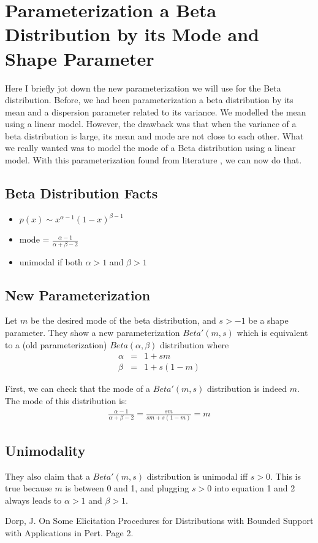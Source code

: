 \documentclass[a4paper,10pt]{article}
\begin{document}
\section{Parameterization a Beta Distribution by its Mode and Shape Parameter}
Here I briefly jot down the new parameterization we will use for the Beta distribution.  Before, we had been parameterization a beta distribution by its mean and a dispersion parameter related to its variance.  We modelled the mean using a linear model.  However, the drawback was that when the variance of a beta distribution is large, its mean and mode are not close to each other.  What we really wanted was to model the mode of a Beta distribution using a linear model.  With this parameterization found from literature \cite{newbeta}, we can now do that.

\subsection{Beta Distribution Facts}
\begin{itemize}
\item $p(x) \sim x^{\alpha-1}(1-x)^{\beta-1}$
\item mode = $\frac{\alpha-1}{\alpha+\beta-2}$
\item unimodal if both $\alpha>1$ and $\beta>1$
\end{itemize}

\subsection{New Parameterization}
Let $m$ be the desired mode of the beta distribution, and $s>-1$ be a shape parameter.  They show a new parameterization $Beta'(m,s)$ which is equivalent to a (old parameterization) $Beta(\alpha,\beta)$ distribution where 
\begin{eqnarray}
\alpha &=& 1 + sm \\
\beta &=& 1 + s(1-m)
\end{eqnarray}

First, we can check that the mode of a $Beta'(m,s)$ distribution is indeed $m$.  The mode of this distribution is:
\begin{eqnarray}
\frac{\alpha-1}{\alpha+\beta-2} = \frac{sm}{sm + s(1-m)} = m
\end{eqnarray}

\subsection{Unimodality}
They also claim that a $Beta'(m,s)$ distribution is unimodal iff $s>0$.  This is true because $m$ is between 0 and 1, and plugging $s>0$ into equation 1 and 2 always leads to $\alpha>1$ and $\beta>1$.


\begin{thebibliography}{10}
 Dorp, J. On Some Elicitation Procedures for Distributions with Bounded Support with Applications in Pert.  Page 2. 
\end{thebibliography}
\end{document}
